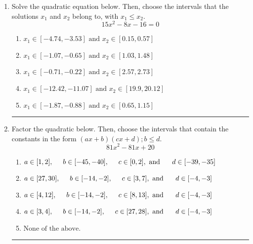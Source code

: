 \documentclass[14pt]{extbook}
\newcommand{\litem}[1]{\item#1\hspace*{-1cm}\rule{\textwidth}{0.4pt}}
\begin{document}
\begin{enumerate}
{\begin{enumerate}[label=\Alph*.]
\end{enumerate} }
\litem{
Solve the quadratic equation below. Then, choose the intervals that the solutions $x_1$ and $x_2$ belong to, with $x_1 \leq x_2$.\[ 15x^{2} -8 x -16 = 0 \]\begin{enumerate}[label=\Alph*.]
\item \( x_1 \in [-4.74, -3.53] \text{ and } x_2 \in [0.15, 0.57] \)
\item \( x_1 \in [-1.07, -0.65] \text{ and } x_2 \in [1.03, 1.48] \)
\item \( x_1 \in [-0.71, -0.22] \text{ and } x_2 \in [2.57, 2.73] \)
\item \( x_1 \in [-12.42, -11.07] \text{ and } x_2 \in [19.9, 20.12] \)
\item \( x_1 \in [-1.87, -0.88] \text{ and } x_2 \in [0.65, 1.15] \)

\end{enumerate} }
\litem{
Factor the quadratic below. Then, choose the intervals that contain the constants in the form $(ax+b)(cx+d); b \leq d.$\[ 81x^{2} -81 x + 20 \]\begin{enumerate}[label=\Alph*.]
\item \( a \in [1, 2], \hspace*{5mm} b \in [-45, -40], \hspace*{5mm} c \in [0, 2], \text{ and } \hspace*{5mm} d \in [-39, -35] \)
\item \( a \in [27, 30], \hspace*{5mm} b \in [-14, -2], \hspace*{5mm} c \in [3, 7], \text{ and } \hspace*{5mm} d \in [-4, -3] \)
\item \( a \in [4, 12], \hspace*{5mm} b \in [-14, -2], \hspace*{5mm} c \in [8, 13], \text{ and } \hspace*{5mm} d \in [-4, -3] \)
\item \( a \in [3, 4], \hspace*{5mm} b \in [-14, -2], \hspace*{5mm} c \in [27, 28], \text{ and } \hspace*{5mm} d \in [-4, -3] \)
\item \( \text{None of the above.} \)


\end{enumerate}}
\end{enumerate}
\end{document}
